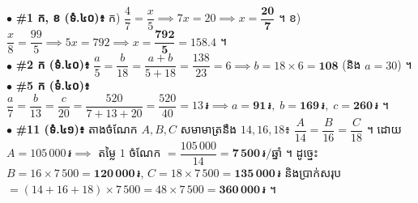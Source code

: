\documentclass[a4paper,10pt]{article}
\newcommand{\riel}{\,\text{៛}}
\begin{document}
\begin{tcolorbox}[
  enhanced, sharp corners, colback=panelgray, colframe=black,
  boxrule=0.85pt, boxsep=1.5pt, top=3pt, bottom=3pt, left=5pt, right=5pt
]
  \fontsize{8.8pt}{13.2pt}\selectfont
  $\bullet$ \textbf{\#1 ក, ខ (ទំ.៤០)៖} ក) $\dfrac{4}{7} = \dfrac{x}{5} \implies 7x = 20 \implies x = \mathbf{\dfrac{20}{7}}$ ។ \quad ខ) $\dfrac{x}{8} = \dfrac{99}{5} \implies 5x = 792 \implies x = \mathbf{\dfrac{792}{5}} = 158.4$ ។\\[2pt]
  $\bullet$ \textbf{\#2 ក (ទំ.៤០)៖} $\dfrac{a}{5} = \dfrac{b}{18} = \dfrac{a+b}{5+18} = \dfrac{138}{23} = 6 \implies b = 18\times 6 = \mathbf{108}$ (និង $a = 30$) ។\\[2pt]
  $\bullet$ \textbf{\#5 ក (ទំ.៤០)៖} $\dfrac{a}{7} = \dfrac{b}{13} = \dfrac{c}{20} = \dfrac{520}{7+13+20} = \dfrac{520}{40} = 13\riel \implies a = \mathbf{91\riel},\; b = \mathbf{169\riel},\; c = \mathbf{260\riel}$ ។\\[2pt]
  $\bullet$ \textbf{\#11 (ទំ.៤១)៖} តាងចំណែក $A, B, C$ សមាមាត្រនឹង $14, 16, 18$៖ $\dfrac{A}{14} = \dfrac{B}{16} = \dfrac{C}{18}$ ។ ដោយ $A = 105\,000\riel \implies$ តម្លៃ $1$ ចំណែក $= \dfrac{105\,000}{14} = \mathbf{7\,500\riel/\text{ឆ្នាំ}}$ ។ ដូច្នេះ $B = 16\times 7\,500 = \mathbf{120\,000\riel}$, $C = 18\times 7\,500 = \mathbf{135\,000\riel}$ និងប្រាក់សរុប $= (14+16+18)\times 7\,500 = 48\times 7\,500 = \mathbf{360\,000\riel}$ ។
\end{tcolorbox}
\end{document}
